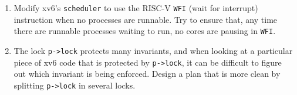 \begin{enumerate}
\item Modify xv6's
\lstinline{scheduler}
to use the
RISC-V
\lstinline{WFI}
(wait for interrupt)
instruction
when no processes are runnable.
Try to ensure that, any time there are runnable processes waiting
to run, no cores are pausing in \texttt{WFI}.

\item The lock
\lstinline{p->lock}
protects many invariants, and when looking at a particular piece of xv6 code that
is protected by
\lstinline{p->lock},
it can be difficult to figure out which invariant is being enforced.  Design a
plan that is more clean by splitting
\lstinline{p->lock}
in several locks.

\end{enumerate}
